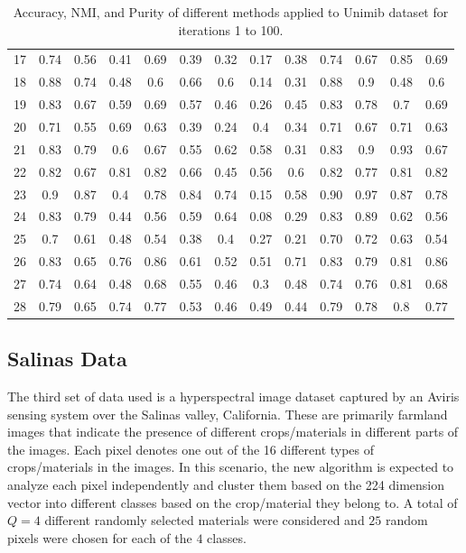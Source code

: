 \documentclass[10pt,final]{IEEEtran}
\begin{document}
\begin{center}
\begin{table}[h!]
\begin{tabular}{|c|c|c|c|c|c|c|c|c|c|c|c|c|}
	17 & 0.74	&	0.56	&	0.41	&	0.69	&	0.39	&	0.32	&	0.17	&	0.38	&	 0.74	&	0.67	&	0.85	&	0.69\\
	18 & 0.88	&	0.74	&	0.48	&	0.6	&	0.66	&	0.6	&	0.14	&	0.31	&	 0.88	&	0.9	&	0.48	&	0.6\\
	19 & 0.83	&	0.67	&	0.59	&	0.69	&	0.57	&	0.46	&	0.26	&	0.45	&	 0.83	&	0.78	&	0.7	&	0.69\\
	20 & 0.71	&	0.55	&	0.69	&	0.63	&	0.39	&	0.24	&	0.4	&	0.34	&	 0.71	&	0.67	&	0.71	&	0.63\\
	21 & 0.83	&	0.79	&	0.6	&	0.67	&	0.55	&	0.62	&	0.58	&	0.31	&	 0.83	&	0.9	&	0.93	&	0.67\\
	22 & 0.82	&	0.67	&	0.81	&	0.82	&	0.66	&	0.45	&	0.56	&	0.6	&	 0.82	&	0.77	&	0.81	&	0.82\\
	23 & 0.9	&	0.87	&	0.4	&	0.78	&	0.84	&	0.74	&	0.15	&	0.58	&	 0.90	&	0.97	&	0.87	&	0.78\\
	24 & 0.83	&	0.79	&	0.44	&	0.56	&	0.59	&	0.64	&	0.08	&	0.29	&	 0.83	&	0.89	&	0.62	&	0.56\\
	25 & 0.7	&	0.61	&	0.48	&	0.54	&	0.38	&	0.4	&	0.27	&	0.21	&	 0.70	&	0.72	&	0.63	&	0.54\\
	26 & 0.83	&	0.65	&	0.76	&	0.86	&	0.61	&	0.52	&	0.51	&	0.71	&	 0.83	&	0.79	&	0.81	&	0.86\\
	27 & 0.74	&	0.64	&	0.48	&	0.68	&	0.55	&	0.46	&	0.3	&	0.48	&	 0.74	&	0.76	&	0.81	&	0.68\\
	28 & 0.79	&	0.65	&	0.74	&	0.77	&	0.53	&	0.46	&	0.49	&	0.44	&	 0.79	&	0.78	&	0.8	&	0.77\\
   \hline
\end{tabular}
\caption{\label{tab:Table I}Accuracy, NMI, and Purity of different methods  applied to Unimib dataset for iterations 1 to 100.}
\end{table}
\end{center}
\subsection{Salinas Data}
The third set of data used is a hyperspectral image dataset captured by an Aviris sensing system over the Salinas valley, California. These are primarily farmland images that indicate the presence of different crops/materials in different parts of the images. Each pixel denotes one out of the 16 different types of crops/materials in the images. In this scenario, the new algorithm is expected to analyze each pixel independently and cluster them based on the 224 dimension vector into different classes based on the crop/material they belong to.  A total of $Q=4$ different randomly selected materials were considered and $25$ random pixels were chosen for each of the $4$ classes. 
\end{document}
